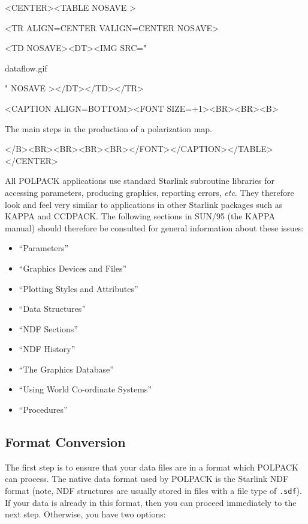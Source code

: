 \documentclass[twoside,11pt]{article}
\newcommand{\xref}[3]{#1}
\newcommand{\xlabel}[1]{}
\renewcommand{\_}{\texttt{\symbol{95}}}
\newcommand{\htmlfig}[3]{
   \label{#1}
   \begin{rawhtml} <CENTER><TABLE NOSAVE > \end{rawhtml}
   \begin{rawhtml} <TR ALIGN=CENTER VALIGN=CENTER NOSAVE> \end{rawhtml}
   \begin{rawhtml} <TD NOSAVE><DT><IMG SRC=" \end{rawhtml}
   #2
   \begin{rawhtml} " NOSAVE ></DT></TD></TR> \end{rawhtml}
   \begin{rawhtml} <CAPTION ALIGN=BOTTOM><FONT SIZE=+1><BR><BR><B> \end{rawhtml}
   #3 
   \begin{rawhtml} </B><BR><BR><BR><BR></FONT></CAPTION></TABLE></CENTER> \end{rawhtml}
}
\begin{document}
\begin{htmlonly}
\htmlfig{fig:dataflow}{dataflow.gif}{
The main steps in the production of a polarization map.}
\end{htmlonly}

All POLPACK applications use standard Starlink subroutine libraries for
accessing parameters, producing graphics, reporting errors, \emph{etc}. They
therefore look and feel very similar to applications in other Starlink
packages such as KAPPA and CCDPACK. The following sections in
\xref{SUN/95}{sun95}{} (the KAPPA manual) should therefore be consulted for general
information about these issues:

\begin{itemize}
\item ``\xref{Parameters}{sun95}{se_param}''
\item ``\xref{Graphics Devices and Files}{sun95}{se_graphdev}''
\item ``\xref{Plotting Styles and Attributes}{sun95}{se_style}''
\item ``\xref{Data Structures}{sun95}{se_datastr}''
\item ``\xref{NDF Sections}{sun95}{se_ndfsect}''
\item ``\xref{NDF History}{sun95}{se_ndfhistory}''
\item ``\xref{The Graphics Database}{sun95}{se_agitate}''
\item ``\xref{Using World Co-ordinate Systems}{sun95}{se_wcsuse}''
\item ``\xref{Procedures}{sun95}{se_procedures}''
\end{itemize}

\subsection{\label{SEC:CONVERT}\xlabel{formatconversion}Format Conversion}
The first step is to ensure that your data files are in a format which
POLPACK can process. The native data format used by POLPACK is the 
Starlink \xref{NDF}{sun33}{} format (note, NDF structures are usually stored in
files with a file type of \verb+.sdf+). If your data is already in this
format, then you can proceed immediately to the next step. Otherwise,
you have two options:
\end{document}
